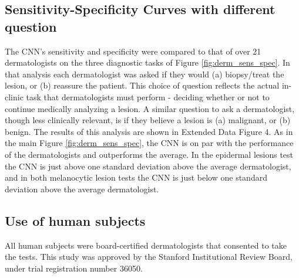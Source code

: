 \subsection{Sensitivity-Specificity Curves with different question}
The CNN's sensitivity and specificity were compared to that of over 21 dermatologists on the three diagnostic tasks of Figure \ref{fig:derm_sens_spec}. In that analysis each dermatologist was asked if they would (a) biopsy/treat the lesion, or (b) reassure the patient. This choice of question reflects the actual in-clinic task that dermatologists must perform - deciding whether or not to continue medically analyzing a lesion. A similar question to ask a dermatologist, though less clinically relevant, is if they believe a lesion is (a) malignant, or (b) benign. The results of this analysis are shown in Extended Data Figure 4. As in the main Figure \ref{fig:derm_sens_spec}, the CNN is on par with the performance of the dermatologists and outperforms the average. In the epidermal lesions test the CNN is just above one standard deviation above the average dermatologist, and in both melanocytic lesion tests the CNN is just below one standard deviation above the average dermatologist. 

\subsection{Use of human subjects}
All human subjects were board-certified dermatologists that consented to take the tests. This study was approved by the Stanford Institutional Review Board, under trial registration number 36050.